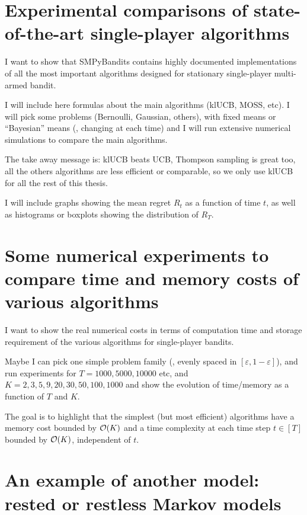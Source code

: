 \section{Experimental comparisons of state-of-the-art single-player algorithms}
\label{sec:3:reviewSPAlgorithms}

I want to show that SMPyBandits contains highly documented implementations of all the most important algorithms designed for stationary single-player multi-armed bandit.

I will include here formulas about the main algorithms (klUCB, MOSS, etc).
I will pick some problems (Bernoulli, Gaussian, others), with fixed means or ``Bayesian'' means (\ie, changing at each time) and I will run extensive numerical simulations to compare the main algorithms.

The take away message is: klUCB beats UCB, Thompson sampling is great too, all the others algorithms are less efficient or comparable, so we only use klUCB for all the rest of this thesis.

I will include graphs showing the mean regret $R_t$ as a function of time $t$, as well as histograms or boxplots showing the distribution of $R_T$.


\section{Some numerical experiments to compare time and memory costs of various algorithms}
\label{sec:3:timeAndMemoryCosts}

I want to show the real numerical costs in terms of computation time and storage requirement of the various algorithms for single-player bandits.

Maybe I can pick one simple problem family (\eg, evenly spaced in $[\varepsilon,1-\varepsilon]$), and run experiments for $T=1000,5000,10000$ etc, and $K=2,3,5,9,20,30,50,100,1000$ and show the evolution of time/memory as a function of $T$ and $K$.

The goal is to highlight that the simplest (but most efficient) algorithms have a memory cost bounded by $\mathop{}\mathopen{}\mathcal{O}\mathopen{}\left(K\right)$ and a time complexity at each time step $t\in[T]$ bounded by $\mathop{}\mathopen{}\mathcal{O}\mathopen{}\left(K\right)$, independent of $t$.


\section{An example of another model: rested or restless Markov models}
\label{sec:3:markovModels}

